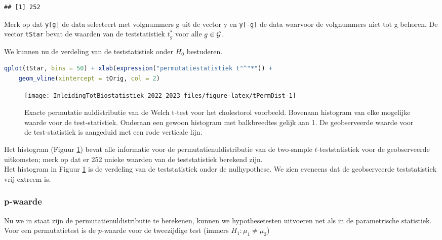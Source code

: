 \documentclass[
  12pt,dutch,coursenotes]{book}
\newcommand{\passthrough}[1]{#1}
\begin{document}
\begin{lstlisting}
## [1] 252
\end{lstlisting}

Merk op dat \passthrough{\lstinline!y[g]!} de data selecteert met volgnummers g uit de vector y en \passthrough{\lstinline!y[-g]!} de data waarvoor de volgnummers niet tot g behoren.
De vector \passthrough{\lstinline!tStar!} bevat de waarden van de teststatistiek \(t^*_g\) voor alle \(g \in {\cal{G}}\).

We kunnen nu de verdeling van de teststatistiek onder \(H_0\) bestuderen.

\begin{lstlisting}[language=R]
qplot(tStar, bins = 50) + xlab(expression("permutatiestatistiek t"^"*")) +
    geom_vline(xintercept = tOrig, col = 2)
\end{lstlisting}

\begin{figure}

{\centering \texttt{[image: InleidingTotBiostatistiek\_2022\_2023\_files/figure-latex/tPermDist-1]} 

}

\caption{Exacte permutatie nuldistributie van de Welch t-test voor het cholestorol voorbeeld. Bovenaan histogram van elke mogelijke waarde voor de test-statistiek. Onderaan een gewoon histogram met balkbreedtes gelijk aan 1. De geobserveerde waarde voor de test-statistiek is aangeduid met een rode verticale lijn.}\label{fig:tPermDist}
\end{figure}

Het histogram (Figuur \ref{fig:tPermDist}) bevat alle informatie voor de permutatienuldistributie van de two-sample \(t\)-teststatistiek voor de geobserveerde uitkomsten; merk op dat er 252 unieke waarden van de teststatistiek berekend zijn.\\
Het histogram in Figuur \ref{fig:tPermDist} is de verdeling van de teststatistiek onder de nulhypothese.
We zien eveneens dat de geobserveerde teststatistiek vrij extreem is.

\hypertarget{p-waarde}{%
\subsubsection{p-waarde}\label{p-waarde}}

Nu we in staat zijn de permutatienuldistributie te berekenen, kunnen we hypothesetesten uitvoeren net als in de parametrische statistiek.
Voor een permutatietest is de \(p\)-waarde voor de tweezijdige test (immers \(H_1: \mu_1 \neq \mu_2\))
\end{document}
